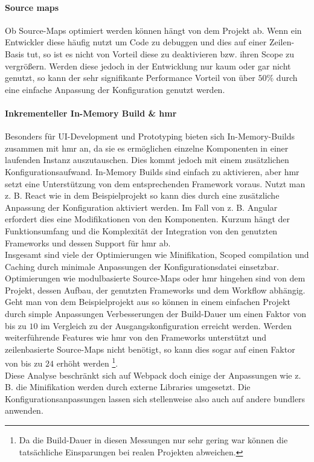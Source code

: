 \documentclass[11pt]{report}
\begin{document}
			\paragraph{Source maps} Ob Source-Maps optimiert werden können hängt von dem Projekt ab. Wenn ein Entwickler diese häufig nutzt um Code zu debuggen und dies auf einer Zeilen-Basis tut, so ist es nicht von Vorteil diese zu deaktivieren bzw. ihren Scope zu vergrößern. Werden diese jedoch in der Entwicklung nur kaum oder gar nicht genutzt, so kann der sehr signifikante Performance Vorteil von über $50 \%$ durch eine einfache Anpassung der Konfiguration genutzt werden.
			\paragraph{Inkrementeller In-Memory Build \& \Gls{hmr}} Besonders für UI-Development und Prototyping bieten sich In-Memory-Builds zusammen mit \Gls{hmr} an, da sie es ermöglichen einzelne Komponenten in einer laufenden Instanz auszutauschen. Dies kommt jedoch mit einem zusätzlichen Konfigurationsaufwand. In-Memory Builds sind einfach zu aktivieren, aber \Gls{hmr} setzt eine Unterstützung von dem entsprechenden Framework voraus. Nutzt man z. B. React wie in dem Beispielprojekt so kann dies durch eine zusätzliche Anpassung der Konfiguration aktiviert werden. Im Fall von z. B. Angular erfordert dies eine Modifikationen von den Komponenten\cite{frameworks:angular-hmr}. Kurzum hängt der Funktionsumfang und die Komplexität der Integration von den genutzten Frameworks und dessen Support für \Gls{hmr} ab.\\
			
			Insgesamt sind viele der Optimierungen wie Minifikation, Scoped compilation und Caching durch minimale Anpassungen der Konfigurationsdatei einsetzbar. Optimierungen wie modulbasierte Source-Maps oder \Gls{hmr} hingehen sind von dem Projekt, dessen Aufbau, der genutzten Frameworks und dem Workflow abhängig.\\
			Geht man von dem Beispielprojekt aus so können in einem einfachen Projekt durch simple Anpassungen Verbesserungen der Build-Dauer um einen Faktor von bis zu $10$ im Vergleich zu der Ausgangskonfiguration erreicht werden. Werden weiterführende Features wie \Gls{hmr} von den Frameworks unterstützt und zeilenbasierte Source-Maps nicht benötigt, so kann dies sogar auf einen Faktor von bis zu $24$ erhöht werden \footnote{Da die Build-Dauer in diesen Messungen nur sehr gering war können die tatsächliche Einsparungen bei realen Projekten abweichen.}.\\
			Diese Analyse beschränkt sich auf Webpack doch einige der Anpassungen wie z. B. die Minifikation\cite{frameworks:uglifyJS} werden durch externe Libraries umgesetzt. Die Konfigurationsanpassungen lassen sich stellenweise also auch auf andere \Glspl{bundler} anwenden.
\end{document}
